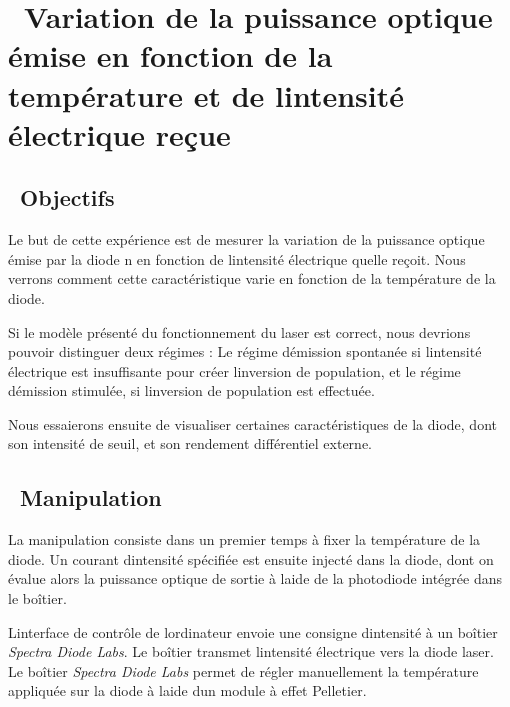 \documentclass[12pt,twoside]{article}
\begin{document}
\section[\ Variation de la puissance optique \'emise en fonction de la
temp\'erature et de l{\textquotesingle}intensit\'e \'electrique
re\c{c}ue]{\ Variation de la puissance optique \'emise en fonction de
la temp\'erature et de l{\textquotesingle}intensit\'e \'electrique
re\c{c}ue}
\subsection[\ Objectifs]{\ Objectifs}
Le but de cette exp\'erience est de mesurer la variation de la puissance
optique \'emise par la diode n{\textdegree} en fonction de
l{\textquotesingle}intensit\'e \'electrique qu{\textquotesingle}elle
re\c{c}oit. Nous verrons comment cette caract\'eristique varie en
fonction de la temp\'erature de la diode. 

Si le mod\`ele pr\'esent\'e du fonctionnement du laser est correct, nous
devrions pouvoir distinguer deux r\'egimes : Le r\'egime
d{\textquotesingle}\'emission spontan\'ee si
l{\textquotesingle}intensit\'e \'electrique est insuffisante pour
cr\'eer l{\textquotesingle}inversion de population, et le r\'egime
d{\textquotesingle}\'emission stimul\'ee, si
l{\textquotesingle}inversion de population est effectu\'ee.

Nous essaierons ensuite de visualiser certaines caract\'eristiques de la
diode, dont son intensit\'e de seuil, et son rendement diff\'erentiel
externe.

\subsection[\ Manipulation]{\ Manipulation}
La manipulation consiste dans un premier temps \`a fixer la
temp\'erature de la diode. Un courant d{\textquotesingle}intensit\'e
sp\'ecifi\'ee est ensuite inject\'e dans la diode, dont on \'evalue
alors la puissance optique de sortie \`a l{\textquotesingle}aide de la
photodiode int\'egr\'ee dans le bo\^itier.

L{\textquotesingle}interface de contr\^ole de
l{\textquotesingle}ordinateur envoie une consigne
d{\textquotesingle}intensit\'e \`a un bo\^itier \textit{Spectra Diode
Labs}\textup{. Le bo\^itier} transmet l{\textquotesingle}intensit\'e
\'electrique vers la diode laser. Le bo\^itier \textit{Spectra Diode
Labs} permet de r\'egler manuellement la temp\'erature appliqu\'ee sur
la diode \`a l{\textquotesingle}aide d{\textquotesingle}un module \`a
effet Pelletier.
\end{document}
